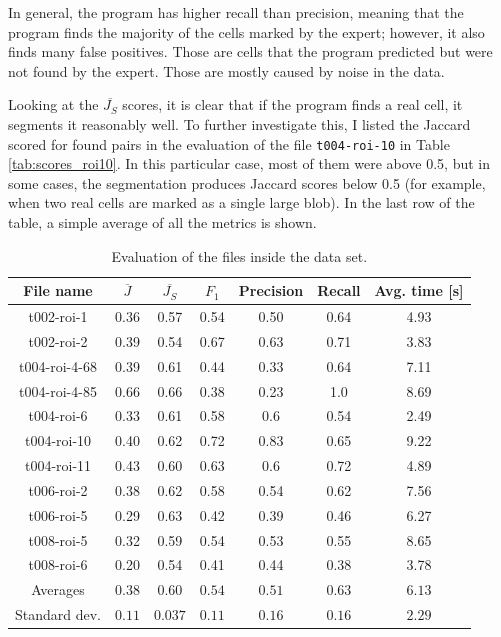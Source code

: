 \documentclass[
  digital,     %
  oneside,     %
  nosansbold,  %
  nocolorbold, %
  lof,         %
  lot,         %
]{fithesis4}
\begin{document}
In general, the program has higher recall than precision, meaning that the
program finds the majority of the cells marked by the expert; however, it also
finds many false positives. Those are cells that the program predicted but were
not found by the expert. Those are mostly caused by noise in the data.

Looking at the $\overline{J_S}$ scores, it is clear that if the program finds a
real cell, it segments it reasonably well. To further investigate this, I listed
the Jaccard scored for found pairs in the evaluation of the file
\texttt{t004-roi-10} in Table \ref{tab:scores_roi10}. In this particular case,
most of them were above 0.5, but in some cases, the segmentation produces Jaccard
scores below 0.5 (for example, when two real cells are marked as a single large
blob). In the last row of the table, a simple average of all the metrics is shown.

\begin{table}
    \hspace*{-0.5cm}\begin{tabular}{|| c|c|c|c|c|c|c ||}
        \toprule
        File name & $\overline{J}$ & $\overline{J_S}$ & \ensuremath{F_1} & Precision & Recall & Avg. time [s]\\
        \midrule
        t002-roi-1&0.36&0.57&0.54&0.50&0.64&4.93\\
        t002-roi-2&0.39&0.54&0.67&0.63&0.71&3.83\\
        t004-roi-4-68&0.39&0.61&0.44&0.33&0.64&7.11\\
        t004-roi-4-85&0.66&0.66&0.38&0.23&1.0&8.69\\
        t004-roi-6&0.33&0.61&0.58&0.6&0.54&2.49\\
        t004-roi-10&0.40&0.62&0.72&0.83&0.65&9.22\\
        t004-roi-11&0.43&0.60&0.63&0.6&0.72&4.89\\
        t006-roi-2&0.38&0.62&0.58&0.54&0.62&7.56\\
        t006-roi-5&0.29&0.63&0.42&0.39&0.46&6.27\\
        t008-roi-5&0.32&0.59&0.54&0.53&0.55&8.65\\
        t008-roi-6&0.20&0.54&0.41&0.44&0.38&3.78\\
        \midrule
        Averages&$0.38$&$0.60$&$0.54$&$0.51$&$0.63$&$6.13$\\
        Standard dev.&$0.11$&$0.037$&$0.11$&$0.16$&$0.16$&$2.29$\\
        \bottomrule
    \end{tabular}
    \caption{Evaluation of the files inside the data set.}
    \label{tab:scores}
\end{table}
\end{document}
